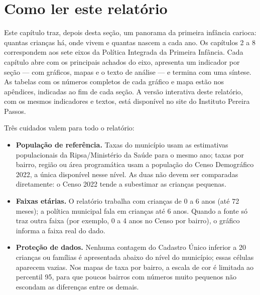 \section{Como ler este relatório}

Este capítulo traz, depois desta seção, um panorama da primeira infância carioca: quantas crianças há, onde
vivem e quantas nascem a cada ano. Os capítulos 2 a 8 correspondem aos sete eixos da Política Integrada da
Primeira Infância. Cada capítulo
abre com os principais achados do eixo, apresenta um indicador por seção --- com gráficos, mapas e o texto
de análise --- e termina com uma síntese. As tabelas com os números completos
de cada gráfico e mapa estão nos apêndices, indicadas ao fim de cada seção. A versão interativa deste
relatório, com os mesmos indicadores e textos, está disponível no site do Instituto Pereira Passos.

Três cuidados valem para todo o relatório:

\begin{itemize}
  \item \textbf{População de referência.} Taxas do município usam as estimativas populacionais da Ripsa/Ministério
    da Saúde para o mesmo ano; taxas por bairro, região ou área programática usam a população do Censo Demográfico
    2022, a única disponível nesse nível. As duas não devem ser comparadas diretamente: o Censo 2022 tende a
    subestimar as crianças pequenas.
  \item \textbf{Faixas etárias.} O relatório trabalha com crianças de 0 a 6 anos (até 72 meses); a política
    municipal fala em crianças até 6 anos. Quando a fonte só traz outra faixa (por exemplo, 0 a 4 anos no Censo por
    bairro), o gráfico informa a faixa real do dado.
  \item \textbf{Proteção de dados.} Nenhuma contagem do Cadastro Único inferior a 20 crianças ou famílias é
    apresentada abaixo do nível do município; essas células aparecem vazias. Nos mapas de taxa por bairro, a
    escala de cor é limitada ao percentil 95, para que poucos bairros com números muito pequenos não escondam as
    diferenças entre os demais.
\end{itemize}
